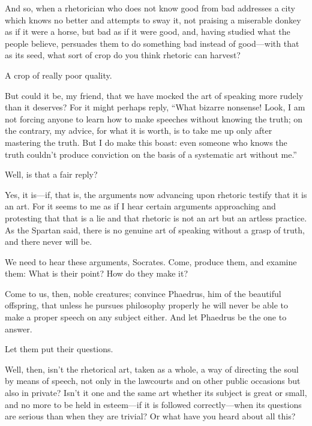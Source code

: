 \saysocrates And so, when a rhetorician who does not know good from bad
addresses a city which knows no better and attempts to sway it, not
praising a miserable donkey as if it were a horse, but bad as if it were
good, and, having studied what the people believe, persuades them to do
something bad instead of good---with that as its seed, what sort of crop 
do you think rhetoric can harvest?

\sayphaedrus A crop of really poor quality.

\saysocrates But could it be, my friend, that we have mocked the art of
speaking more rudely than it deserves? For it might perhaps reply, “What
bizarre nonsense! Look, I am not forcing anyone to learn how to make
speeches without knowing the truth; on the contrary, my advice, for what
it is worth, is to take me up only after mastering the truth. But I do
make this boast: even someone who knows the truth couldn't produce
conviction on the basis of a systematic art without me.”

\sayphaedrus Well, is that a fair reply?

\saysocrates Yes, it is---if, that is, the arguments now advancing upon
rhetoric testify that it is an art. For it seems to me as if I hear
certain arguments approaching and protesting that that is a lie and that
rhetoric is not an art but an artless
practice. As the
Spartan said, there is no genuine art of speaking without a grasp of
truth, and there never will be.

\sayphaedrus We need to hear these arguments, Socrates. Come, produce
them, and examine them: What is their point? How do they
make it?

\saysocrates Come to us, then, noble creatures; convince Phaedrus, him of
the beautiful
offspring, that unless
he pursues philosophy properly he will never be able to make a proper
speech on any subject either. And let Phaedrus be the one to answer.

\sayphaedrus Let them put their questions.

\saysocrates Well, then, isn't the rhetorical art, taken as a whole, a way
of directing the soul by means of speech, not only in the lawcourts and
on other public occasions but also in private? Isn't it one and the same
art whether its subject is great or small, and no more to be held in
esteem---if it is followed correctly---when its questions are
serious than when they are trivial? Or what have you heard about all
this?

